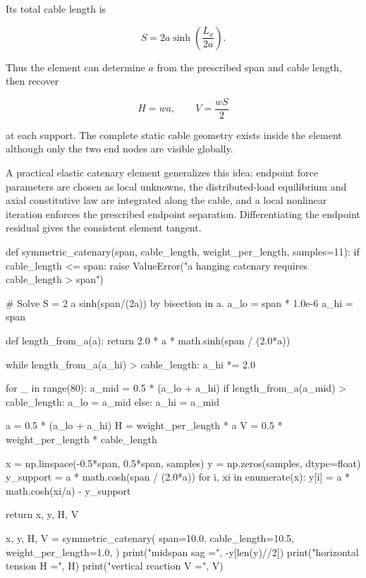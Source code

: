 Its total cable length is

\begin{equation}\label{eq:catenary-length}
    \boxed{
    S=2a\sinh\left(\frac{L_x}{2a}\right)
    }.
\end{equation}

Thus the element can determine $a$ from the prescribed span and cable length,
then recover

\begin{equation}
    H=wa,
    \qquad
    V=\frac{wS}{2}
\end{equation}

at each support.  The complete static cable geometry exists inside the element
although only the two end nodes are visible globally.

A practical elastic catenary element generalizes this idea: endpoint force
parameters are chosen as local unknowns, the distributed-load equilibrium and
axial constitutive law are integrated along the cable, and a local nonlinear
iteration enforces the prescribed endpoint separation.  Differentiating the
endpoint residual gives the consistent element tangent.

\begin{python}
def symmetric_catenary(span, cable_length, weight_per_length, samples=11):
    if cable_length <= span:
        raise ValueError("a hanging catenary requires cable_length > span")

    # Solve S = 2 a sinh(span/(2a)) by bisection in a.
    a_lo = span * 1.0e-6
    a_hi = span

    def length_from_a(a):
        return 2.0 * a * math.sinh(span / (2.0*a))

    while length_from_a(a_hi) > cable_length:
        a_hi *= 2.0

    for _ in range(80):
        a_mid = 0.5 * (a_lo + a_hi)
        if length_from_a(a_mid) > cable_length:
            a_lo = a_mid
        else:
            a_hi = a_mid

    a = 0.5 * (a_lo + a_hi)
    H = weight_per_length * a
    V = 0.5 * weight_per_length * cable_length

    x = np.linspace(-0.5*span, 0.5*span, samples)
    y = np.zeros(samples, dtype=float)
    y_support = a * math.cosh(span / (2.0*a))
    for i, xi in enumerate(x):
        y[i] = a * math.cosh(xi/a) - y_support

    return x, y, H, V


x, y, H, V = symmetric_catenary(
    span=10.0,
    cable_length=10.5,
    weight_per_length=1.0,
)
print("midspan sag =", -y[len(y)//2])
print("horizontal tension H =", H)
print("vertical reaction V =", V)
\end{python}


